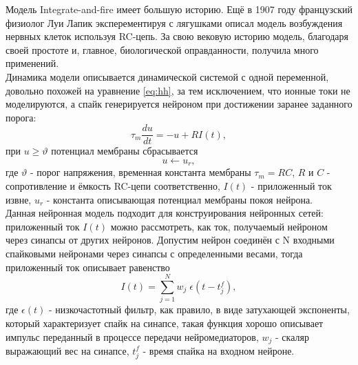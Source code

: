 \documentclass[a4paper,10pt]{article}
\begin{document}
\indent Модель Integrate-and-fire имеет большую историю. Ещё в 1907 году 	французский физиолог Луи Лапик эксперементируя с лягушками описал модель возбуждения нервных клеток используя RC-цепь\cite{Lapicque}. За свою вековую историю модель, благодаря своей простоте и, главное, биологической оправданности, получила много применений.\\
   \indent Динамика модели описывается динамической системой с одной переменной, довольно похожей на уравнение \eqref{eq:hh}, за тем исключением, что ионные токи не моделируются, а спайк генерируется нейроном при достижении заранее заданного порога:\\
   \begin{equation}\label{eq:iaf}
   \tau_{m}\frac{du}{dt} =-u+R I(t),
   \end{equation}
при $u \geq \vartheta$ потенциал мембраны сбрасывается   
   \begin{equation}\label{eq:iaf_reset}
   u \leftarrow u_{r},
   \end{equation}
где $\vartheta$ - порог напряжения, временная константа мембраны $\tau_{m}=RC$, $R$ и $C$ - сопротивление и ёмкость RC-цепи соответственно, $I(t)$ - приложенный ток извне, $u_{r}$ - константа описывающая потенциал мембраны покоя нейрона.\\   
\indent Данная нейронная модель подходит для конструирования нейронных сетей: приложенный ток $I(t)$ можно рассмотреть, как ток, получаемый нейроном через синапсы от других нейронов. Допустим нейрон соединён с N входными спайковыми нейронами через синапсы с определенными весами, тогда приложенный ток описывает равенство
\begin{equation}\label{eq:iaf_syn}
I(t) = \sum_{j=1}^{N} w_{j}\; \epsilon(t-t_{j}^{f}),
\end{equation}
где $\epsilon(t)$ - низкочастотный фильтр, как правило, в виде затухающей экспоненты, который характеризует спайк на синапсе, такая функция хорошо описывает импульс переданный в процессе передачи нейромедиаторов, $w_{j}$ - скаляр выражающий вес на синапсе, $t_{j}^{f}$ - время спайка на входном нейроне.\\
\end{document}
